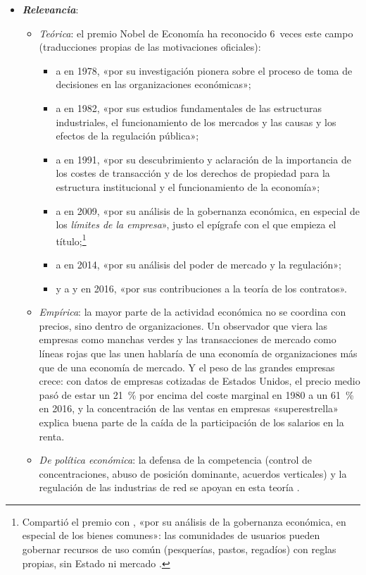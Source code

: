 \documentclass[11pt]{article}
\begin{document}
\begin{itemize}
\item \textbf{\emph{Relevancia}}:
  \begin{itemize}
  \item \emph{Teórica}: el premio Nobel de Economía ha reconocido 6~veces este campo (traducciones propias de las motivaciones oficiales):
    \begin{itemize}
    \item a  en 1978, «por su investigación pionera sobre el proceso de toma de decisiones en las organizaciones económicas»\nocite{Nobel1978Simon};
    \item a  en 1982, «por sus estudios fundamentales de las estructuras industriales, el funcionamiento de los mercados y las causas y los efectos de la regulación pública»\nocite{Nobel1982Stigler};
    \item a  en 1991, «por su descubrimiento y aclaración de la importancia de los costes de transacción y de los derechos de propiedad para la estructura institucional y el funcionamiento de la economía»\nocite{Nobel1991Coase};
    \item a  en 2009, «por su análisis de la gobernanza económica, en especial de los \emph{límites de la empresa}», justo el epígrafe con el que empieza el título\nocite{Nobel2009OstromWilliamson};\footnote{Compartió el premio con , «por su análisis de la gobernanza económica, en especial de los bienes comunes»: las comunidades de usuarios pueden gobernar recursos de uso común (pesquerías, pastos, regadíos) con reglas propias, sin Estado ni mercado .}
    \item a  en 2014, «por su análisis del poder de mercado y la regulación»\nocite{Nobel2014Tirole};
    \item y a  y  en 2016, «por sus contribuciones a la teoría de los contratos»\nocite{Nobel2016HartHolmstrom}.
    \end{itemize}
  \item \emph{Empírica}: la mayor parte de la actividad económica no se coordina con precios, sino dentro de organizaciones. Un observador que viera las empresas como manchas verdes y las transacciones de mercado como líneas rojas que las unen hablaría de una economía de organizaciones más que de una economía de mercado\nocite{Simon1991Organizations}. Y el peso de las grandes empresas crece: con datos de empresas cotizadas de Estados Unidos, el precio medio pasó de estar un 21~\% por encima del coste marginal en 1980 a un 61~\% en 2016\nocite{DeLoeckerEeckhoutUnger2020Rise}, y la concentración de las ventas en empresas «superestrella» explica buena parte de la caída de la participación de los salarios en la renta\nocite{AutorEtAl2020Fall}.
  \item \emph{De política económica}: la defensa de la competencia (control de concentraciones, abuso de posición dominante, acuerdos verticales) y la regulación de las industrias de red se apoyan en esta teoría   .
  \end{itemize}


\end{itemize}
\end{document}
